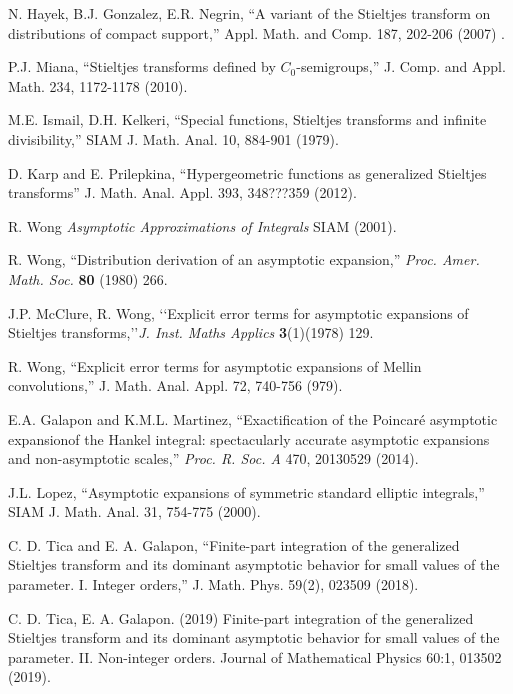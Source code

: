 \begin{thebibliography}{00}
 N. Hayek, B.J. Gonzalez, E.R. Negrin, ``A variant of the Stieltjes transform on distributions of compact support,'' Appl. Math. and Comp. 187, 202-206 (2007) .

 P.J. Miana, ``Stieltjes transforms defined by $C_0$-semigroups,'' J. Comp. and Appl. Math. 234, 1172-1178 (2010).

 M.E. Ismail, D.H. Kelkeri, ``Special functions, Stieltjes transforms and infinite divisibility,'' SIAM J. Math. Anal. 10, 884-901 (1979).

 D. Karp and E. Prilepkina, ``Hypergeometric functions as generalized Stieltjes transforms'' J. Math. Anal. Appl. 393, 348???359 (2012).

 R. Wong {\it Asymptotic Approximations of Integrals}  SIAM (2001).

 R. Wong, ``Distribution derivation of an asymptotic expansion,'' \textit{Proc. Amer. Math. Soc.} \textbf{80} (1980) 266.

 J.P. McClure, R. Wong, \lq\lq Explicit error terms for asymptotic expansions of Stieltjes transforms,\rq\rq \textit{J. Inst. Maths Applics} \textbf{3}(1)(1978) 129.

 R. Wong, ``Explicit error terms for asymptotic expansions of Mellin convolutions,'' J. Math. Anal. Appl. 72, 740-756 (979).

 E.A. Galapon and K.M.L. Martinez, ``Exactification of the Poincaré asymptotic expansionof the Hankel integral: spectacularly accurate asymptotic expansions and non-asymptotic scales,'' {\it Proc. R. Soc. A} 470, 20130529 (2014).

 J.L. Lopez, ``Asymptotic expansions of symmetric standard elliptic integrals,'' SIAM J. Math. Anal. 31, 754-775 (2000).

C. D. Tica and E. A. Galapon, “Finite-part integration of the generalized Stieltjes transform and its
dominant asymptotic behavior for small values of the parameter. I. Integer orders,” J. Math. Phys. 59(2),
023509 (2018).

C. D. Tica, E. A. Galapon. (2019) Finite-part integration of the generalized Stieltjes transform
and its dominant asymptotic behavior for small values of the parameter. II. Non-integer orders. Journal
of Mathematical Physics 60:1, 013502 (2019).


\end{thebibliography}
